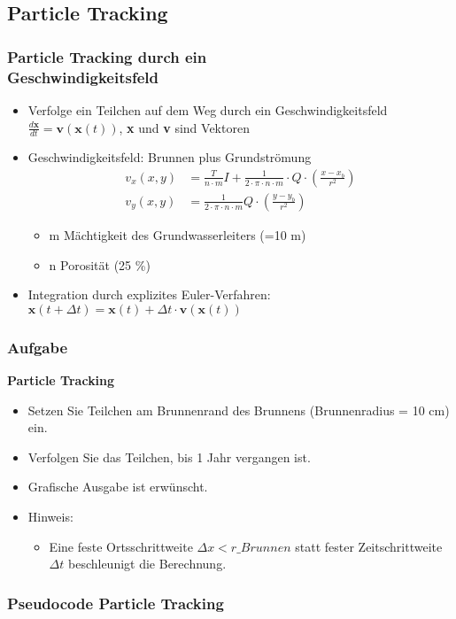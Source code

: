 \subsection{Particle Tracking}
  	\begin{frame}
		\frametitle{Particle Tracking durch ein \\Geschwindigkeitsfeld}
		\begin{itemize}
			   \item Verfolge ein Teilchen auf dem Weg durch ein Geschwindigkeitsfeld $\frac{d\textbf{x}}{dt}=\textbf{v}\left(\textbf{x}\left(t \right) \right)$, \textbf{x} und \textbf{v} sind Vektoren          
               \item Geschwindigkeitsfeld: Brunnen plus Grundströmung
                 \begin{align*}
                     v_{x}(x,y) &= \frac{T}{n \cdot m}I+\frac{1}{2 \cdot \pi \cdot n \cdot m}\cdot Q \cdot \left( \frac{x-x_{b}}{r^{2}} \right) \\
         		     v_{y}(x,y) &= \frac{1}{2 \cdot \pi \cdot n \cdot m}Q \cdot \left( \frac{y-y_{b}}{r^{2}} \right)
         		 \end{align*}
          
                  \begin{itemize}
					\item m	Mächtigkeit des Grundwasserleiters (=10 m)
					\item n	Porosität (25 \%)
				  \end{itemize}
				 \item Integration durch explizites Euler-Verfahren: $\textbf{x} \left(t+\Delta t \right)=\textbf{x}(t)+\Delta t \cdot \textbf{v}(\textbf{x}(t))$

		\end{itemize}
   	\end{frame}

 \begin{frame}
		\frametitle{Aufgabe}
          \begin{exercise}
              \sloppy          
              \textbf{Particle Tracking}
              \begin{itemize}
                \item Setzen Sie Teilchen am Brunnenrand des Brunnens (Brunnenradius = 10 cm) ein.
				\item Verfolgen Sie das Teilchen, bis 1 Jahr vergangen ist.
				\item Grafische Ausgabe ist erwünscht.
				\item Hinweis:
				\begin{itemize}
					\item Eine feste Ortsschrittweite $\Delta x < r\_Brunnen$ statt fester Zeitschrittweite $\Delta t$ beschleunigt die Berechnung.

				\end{itemize}
              \end{itemize}
          \end{exercise}
      \end{frame}
      
      \begin{frame}
		\frametitle{Pseudocode Particle Tracking}
          

			
   	\end{frame}


